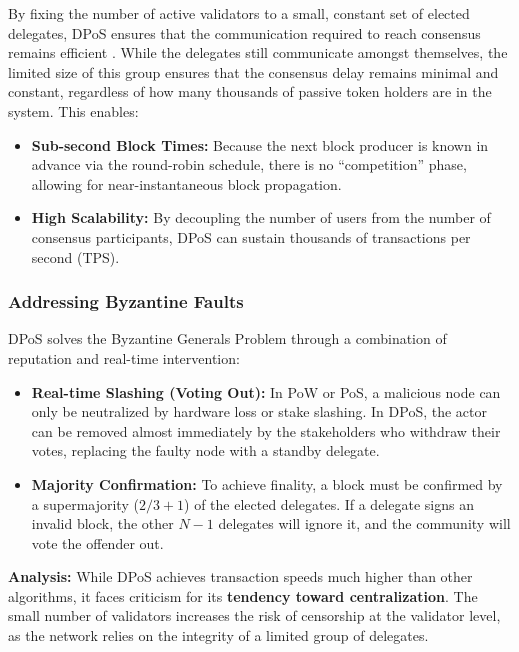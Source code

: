 By fixing the number of active validators to a small, constant set of elected delegates, DPoS ensures that the communication required to reach consensus remains efficient \cite{larimer2014dpos}. While the delegates still communicate amongst themselves, the limited size of this group ensures that the consensus delay remains minimal and constant, regardless of how many thousands of passive token holders are in the system. This enables:

\begin{itemize}
    \item \textbf{Sub-second Block Times:} Because the next block producer is known in advance via the round-robin schedule, there is no \enquote{competition} phase, allowing for near-instantaneous block propagation.
    \item \textbf{High Scalability:} By decoupling the number of users from the number of consensus participants, DPoS can sustain thousands of transactions per second (TPS)\cite{springer2025_dpos_scalability}.
\end{itemize}


\subsubsection{Addressing Byzantine Faults}
DPoS solves the Byzantine Generals Problem through a combination of reputation and real-time intervention:
\begin{itemize}
    \item \textbf{Real-time Slashing (Voting Out):} In PoW or PoS, a malicious node can only be neutralized by hardware loss or stake slashing. In DPoS, the actor can be removed almost immediately by the stakeholders who withdraw their votes, replacing the faulty node with a standby delegate.
    \item \textbf{Majority Confirmation:} To achieve finality, a block must be confirmed by a supermajority ($2/3+1$) of the elected delegates. If a delegate signs an invalid block, the other $N-1$ delegates will ignore it, and the community will vote the offender out.
\end{itemize}

\textbf{Analysis:} 
While DPoS achieves transaction speeds much higher than other algorithms, it faces criticism for its \textbf{tendency toward centralization}. The small number of validators increases the risk of censorship at the validator level, as the network relies on the integrity of a limited group of delegates.

